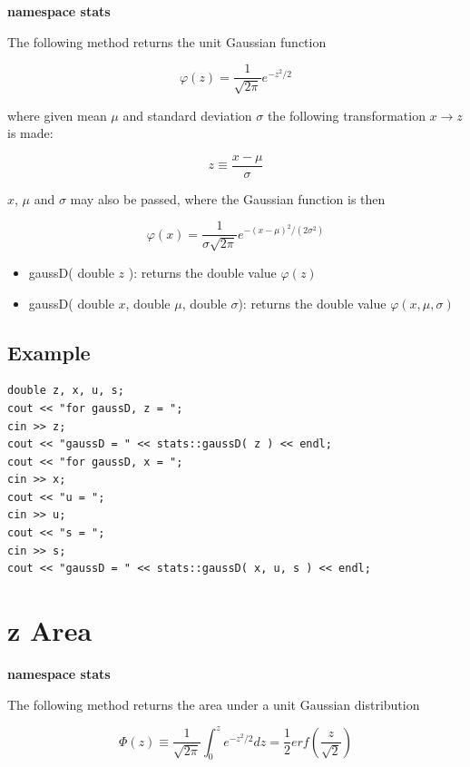 \documentclass{report}
\begin{document}
{\bf namespace stats}

The following method returns the unit Gaussian function

\begin{equation}
\varphi(z) = \frac{1}{\sqrt{2\pi}} e^{-z^2/2}
\end{equation}

where given mean $\mu$ and standard deviation $\sigma$ the following
transformation $x \rightarrow z$ is made:

\begin{displaymath}
z \equiv \frac{x-\mu}{\sigma}
\end{displaymath}

$x$, $\mu$ and $\sigma$ may also be passed, where the Gaussian
function
is then

\begin{equation}
\varphi(x) = \frac{1}{\sigma\sqrt{2\pi}} e^{-(x-\mu)^2/(2\sigma^2)}
\end{equation}

\begin{itemize}
\item gaussD( double $z$ ): returns the double value $\varphi(z)$
\item gaussD( double $x$, double $\mu$, double $\sigma$): returns
the double value $\varphi(x, \mu, \sigma)$
\end{itemize}

\subsection{Example}
\begin{verbatim}
double z, x, u, s;
cout << "for gaussD, z = ";
cin >> z;
cout << "gaussD = " << stats::gaussD( z ) << endl;
cout << "for gaussD, x = ";
cin >> x;
cout << "u = ";
cin >> u;
cout << "s = ";
cin >> s;
cout << "gaussD = " << stats::gaussD( x, u, s ) << endl;
\end{verbatim}

\section{z Area}

{\bf namespace stats}

The following method returns the area under a unit Gaussian
distribution

\begin{equation}
\Phi(z) \equiv \frac{1}{\sqrt{2\pi}} \int_0^z e^{-z^2/2} dz =
\frac{1}{2} erf(\frac{z}{\sqrt{2}})
\end{equation}
\end{document}

